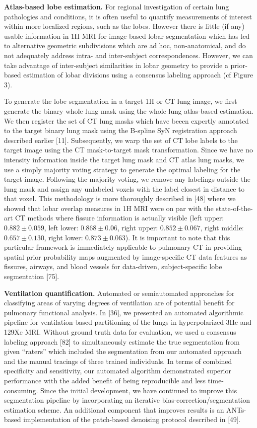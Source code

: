 \documentclass[11pt,]{article}
\begin{document}


\textbf{Atlas-based lobe estimation.} For regional investigation of
certain lung pathologies and conditions, it is often useful to quantify
measurements of interest within more localized regions, such as the
lobes. However there is little (if any) usable information in 1H MRI for
image-based lobar segmentation which has led to alternative geometric
subdivisions which are ad hoc, non-anatomical, and do not adequately
address intra- and inter-subject correspondences. However, we can take
advantage of inter-subject similarities in lobar geometry to provide a
prior-based estimation of lobar divisions using a consensus labeling
approach (cf Figure 3).

To generate the lobe segmentation in a target 1H or CT lung image, we
first generate the binary whole lung mask using the whole lung
atlas-based estimation. We then register the set of CT lung masks which
have beeen expertly annotated to the target binary lung mask using the
B-spline SyN registration approach described earlier {[}11{]}.
Subsequently, we warp the set of CT lobe labels to the target image
using the CT mask-to-target mask transformation. Since we have no
intensity information inside the target lung mask and CT atlas lung
masks, we use a simply majority voting strategy to generate the optimal
labeling for the target image. Following the majority voting, we remove
any labelings outside the lung mask and assign any unlabeled voxels with
the label closest in distance to that voxel. This methodology is more
thoroughly described in {[}48{]} where we showed that lobar overlap
measures in 1H MRI were on par with the state-of-the-art CT methods
where fissure information is actually visible (left upper:
$0.882 \pm 0.059$, left lower: $0.868 \pm 0.06$, right upper:
$0.852 \pm 0.067$, right middle: $0.657 \pm 0.130$, right lower:
$0.873 \pm 0.063$). It is important to note that this particular
framework is immediately applicable to pulmonary CT in providing spatial
prior probability maps augmented by image-specific CT data features as
fissures, airways, and blood vessels for data-driven, subject-specific
lobe segmentation {[}75{]}.

\textbf{Ventilation quantification.} Automated or semiautomated
approaches for classifying areas of varying degrees of ventilation are
of potential benefit for pulmonary functional analysis. In {[}36{]}, we
presented an automated algorithmic pipeline for ventilation-based
partitioning of the lungs in hyperpolarized 3He and 129Xe MRI. Without
ground truth data for evaluation, we used a consensus labeling approach
{[}82{]} to simultaneously estimate the true segmentation from given
``raters'' which included the segmentation from our automated approach
and the manual tracings of three trained individuals. In terms of
combined specificity and sensitivity, our automated algorithm
demonstrated superior performance with the added benefit of being
reproducible and less time-consuming. Since the initial development, we
have continued to improve this segmentation pipeline by incorporating an
iterative bias-correction/segmentation estimation scheme. An additional
component that improves results is an ANTs-based implementation of the
patch-based denoising protocol described in {[}49{]}.
\end{document}
